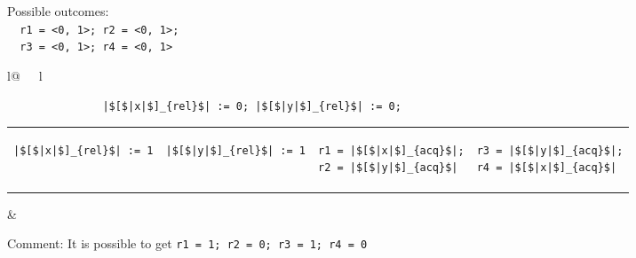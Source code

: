 \begin{minipage}[t]{0.3\linewidth}
Possible outcomes:\\
\lstinline{  r1 = <0, 1>; r2 = <0, 1>;}\\
\lstinline{  r3 = <0, 1>; r4 = <0, 1>}\\
\end{minipage}
%
\begin{minipage}[t]{0.5\linewidth}
\vspace{-.2cm}
  \begin{tabular}{l@{\ \ \ }l}
    \begin{minipage}[l]{4.3cm} \small
\begin{lstlisting}
               |$[$|x|$]_{rel}$| := 0; |$[$|y|$]_{rel}$| := 0;
\end{lstlisting}
\vspace{-.2cm}
\begin{tabular}{l||l||l||l}
\begin{lstlisting}
|$[$|x|$]_{rel}$| := 1
\end{lstlisting}
\hspace{.6cm}
&
\begin{lstlisting}
|$[$|y|$]_{rel}$| := 1
\end{lstlisting}
\hspace{.6cm}
&
\begin{lstlisting}
r1 = |$[$|x|$]_{acq}$|;
r2 = |$[$|y|$]_{acq}$|
\end{lstlisting}
\hspace{.6cm}
&
\begin{lstlisting}
r3 = |$[$|y|$]_{acq}$|;
r4 = |$[$|x|$]_{acq}$|
\end{lstlisting}
\end{tabular}
    \end{minipage}
&
  \end{tabular}
\end{minipage}

Comment:
It is possible to get
\lstinline{r1 = 1; r2 = 0; r3 = 1; r4 = 0}
\litmusTestEnd

